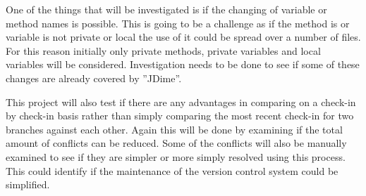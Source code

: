\documentclass[12pt]{CRPITStyle}
\begin{document}
One of the things that will be investigated is if the changing of variable or method names is possible. This is going to be a challenge as if the method is or variable is not private or local the use of it could be spread over a number of files. For this reason initially only private methods, private variables and local variables will be considered. Investigation needs to be done to see if some of these changes are already covered by ''JDime''.

This project will also test if there are any advantages in comparing on a check-in by check-in basis rather than simply comparing the most recent check-in for two branches against each other. Again this will be done by examining if the total amount of conflicts can be reduced. Some of the conflicts will also be manually examined to see if they are simpler or more simply resolved using this process. This could identify if the maintenance of the version control system could be simplified.



\end{document}
